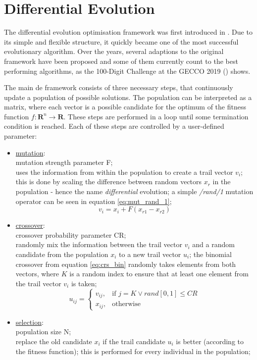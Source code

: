 \documentclass[./\jobname.tex]{subfiles}
\begin{document}
\section{Differential Evolution}

The differential evolution optimisation framework was first introduced in \cite{storn_differential_1997}. Due to its simple and flexible structure, it quickly became one of the most successful evolutionary algorithm. Over the years, several adaptions to the original framework have been proposed and some of them currently count to the best performing algorithms, as the 100-Digit Challenge at the GECCO 2019 (\cite{suganthan_p-n-suganthancec2019_2020}) shows. 

The main \gls{de} framework consists of three necessary steps, that continuously update a population of possible solutions. The population can be interpreted as a matrix, where each vector is a possible candidate for the optimum of the fitness function $f: \mathbf{R}^n \rightarrow \mathbf{R}$. These steps are performed in a loop until some termination condition is reached. Each of these steps are controlled by a user-defined parameter: 
\begin{itemize}
	\item \underline{mutation}: \\
		  mutation strength parameter F;\\
		  uses the information from within the population to create a trail vector $v_i$;\\
		  this is done by scaling the difference between random vectors $x_{r}$ in the population - hence the name \textit{differential} evolution; a simple \textit{/rand/1} mutation operator can be seen in equation \ref{eq:mut_rand_1};
		  \begin{equation}
		  \label{eq:mut_rand_1}
		  v_i = x_{i} + F(x_{r1} - x_{r2})
		  \end{equation}
	\item \underline{crossover}: \\
		  crossover probability parameter CR;\\
		  randomly mix the information between the trail vector $v_i$ and a random candidate from the population $x_{i}$ to a new trail vector $u_i$; the binomial crossover from equation \ref{eq:crs_bin} randomly takes elements from both vectors, where $K$ is a random index to ensure that at least one element from the trail vector $v_i$ is taken;
		  \begin{equation}
		  \label{eq:crs_bin}
		  u_{ij}=\begin{cases}
		  v_{ij}, &\text{if $j = K \lor rand[0,1] \leq CR$}\\
		  x_{ij}, &\text{otherwise}
		  \end{cases}
		  \end{equation}
	\item \underline{selection}: \\
		  population size N;\\
		  replace the old candidate $x_i$ if the trail candidate $u_i$ is better (according to the fitness function); this is performed for every individual in the population;
\end{itemize}  
\end{document}
